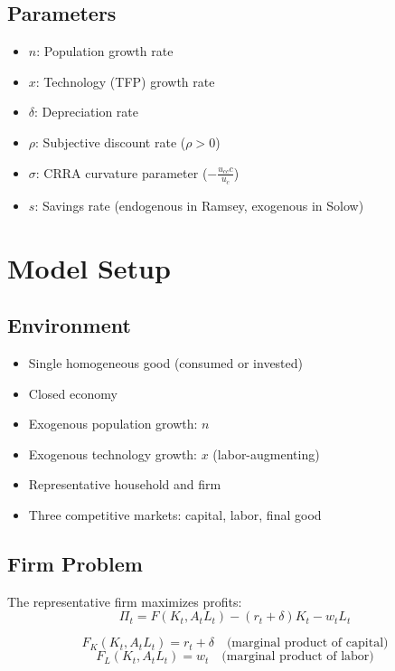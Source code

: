\documentclass[a4paper,11pt]{article}
\begin{document}
\subsection*{Parameters}
\begin{itemize}
    \item $n$: Population growth rate
    \item $x$: Technology (TFP) growth rate
    \item $\delta$: Depreciation rate
    \item $\rho$: Subjective discount rate ($\rho > 0$)
    \item $\sigma$: CRRA curvature parameter ($-\frac{u_{cc}c}{u_c}$)
    \item $s$: Savings rate (endogenous in Ramsey, exogenous in Solow)
\end{itemize}

\clearpage

\section*{Model Setup}

\subsection*{Environment}
\begin{itemize}
    \item Single homogeneous good (consumed or invested)
    \item Closed economy
    \item Exogenous population growth: $n$
    \item Exogenous technology growth: $x$ (labor-augmenting)
    \item Representative household and firm
    \item Three competitive markets: capital, labor, final good
\end{itemize}

\subsection*{Firm Problem}
The representative firm maximizes profits:
\[
\Pi_t = F(K_t, A_t L_t) - (r_t + \delta)K_t - w_t L_t
\]
\begin{resultbox}
\[
F_K(K_t, A_t L_t) = r_t + \delta \quad \text{(marginal product of capital)}
\]
\[
F_L(K_t, A_t L_t) = w_t \quad \text{(marginal product of labor)}
\]
\end{resultbox}
\end{document}
